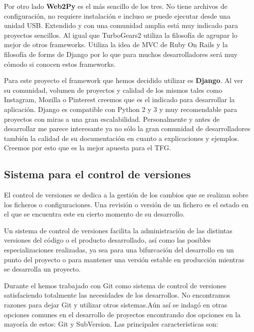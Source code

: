 \bigskip
Por otro lado \textbf{Web2Py} es el más sencillo de los tres. No tiene archivos de configuración, no requiere instalación e incluso se puede ejecutar desde una unidad USB. Extendido y con una comunidad amplia está muy indicado para proyectos sencillos. Al igual que TurboGears2 utiliza la filosofía de agrupar lo mejor de otros frameworks. Utiliza la idea de MVC de Ruby On Rails  y la filosofía de forms de Django por lo que para muchos desarrolladores será muy cómodo si conocen estos frameworks.


\bigskip
Para este proyecto el framework que hemos decidido utilizar es \textbf{Django}. Al ver su comunidad, volumen de proyectos y calidad de los mismos tales como Instagram, Mozilla o Pinterest creemos que es el indicado para desarrollar la aplicación. Django es compatible con Python 2 y 3 y muy recomendable para proyectos con miras a una gran escalabilidad. Personalmente y antes de desarrollar {\titulo} me parece interesante ya no sólo la gran comunidad de desarrolladores también la calidad de su documentación en cuanto a explicaciones y ejemplos. Creemos por esto que es la mejor apuesta para el TFG.



\subsection{Sistema para el control de versiones}

El control de versiones se dedica a la gestión de los cambios que se realizan sobre los ficheros o configuraciones. Una revisión o versión de un fichero es el estado en el que se encuentra este en cierto momento de su desarrollo.

\bigskip
Un sistema de control de versiones facilita la administración de las distintas versiones del código o el producto desarrollado, así como las posibles especializaciones realizadas, ya sea para una bifurcación del desarrollo en un punto del proyecto o para mantener una versión estable en producción mientras se desarrolla un proyecto.

\bigskip
Durante el {\grado} hemos trabajado con Git como sistema de control de versiones satisfaciendo totalmente las necesidades de los desarrollos. No encontramos razones para dejar Git y utilizar otros sistemas.Aún así se indagó en otras opciones comunes en el desarrollo de proyectos encontrando dos opciones en la mayoría de estos: Git y SubVersion. Las principales características son:

